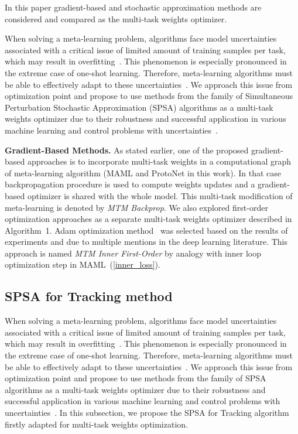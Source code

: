 \documentclass{article}
\begin{document}
In this paper gradient-based and stochastic approximation methods are considered and compared as the multi-task weights optimizer. 

When solving a meta-learning problem, algorithms face model uncertainties associated with a critical issue of limited amount of training samples per task, which may result in overfitting~\cite{nguyen2020uncertainty}. This phenomenon is especially pronounced in the extreme case of one-shot learning. Therefore, meta-learning algorithms must be able to effectively adapt to these uncertainties~\cite{finn2018probabilistic, abdar2021review}. We approach this issue from optimization point and propose to use methods from the family of Simultaneous Perturbation Stochastic Approximation (SPSA) algorithms as a multi-task weights optimizer due to their robustness and successful application in various machine learning and control problems with uncertainties~\cite{yue2007using, granichin2015randomized, boiarov2019stochastic}.



{\bf Gradient-Based Methods.} As stated earlier, one of the proposed gradient-based approaches is to incorporate multi-task weights in a computational graph of meta-learning algorithm (MAML and ProtoNet in this work). In that case backpropagation procedure is used to compute weights updates and a gradient-based optimizer is shared with the whole model. This multi-task modification of meta-learning is denoted by {\it MTM Backprop}. We also explored first-order optimization approaches as a separate multi-task weights optimizer described in Algorithm~1. Adam optimization method~\cite{kingma2015adam} was selected based on the results of experiments and due to multiple mentions in the deep learning literature. This approach is named {\it MTM Inner First-Order} by analogy with inner loop optimization step in MAML~(\ref{inner_loss}). 






\subsection{SPSA for Tracking method}

When solving a meta-learning problem, algorithms face model uncertainties associated with a critical issue of limited amount of training samples per task, which may result in overfitting~\cite{nguyen2020uncertainty}. This phenomenon is especially pronounced in the extreme case of one-shot learning. Therefore, meta-learning algorithms must be able to effectively adapt to these uncertainties~\cite{finn2018probabilistic,abdar2021review}.
We approach this issue from optimization point and propose to use methods from the family of SPSA algorithms as a multi-task weights optimizer due to their robustness and successful application in various machine learning and control problems with uncertainties~\cite{granichin2015randomized}. In this subsection, we propose the SPSA for Tracking algorithm firstly adapted for multi-task weights optimization.
\end{document}
